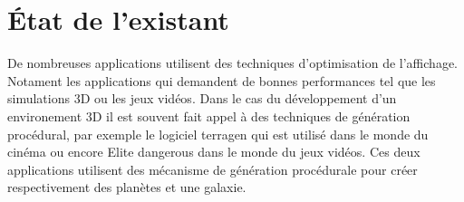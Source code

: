 \documentclass[12pt]{report}
\begin{document}
\newpage

\chapter*{État de l'existant}
\setcounter{chapter}{2}



De nombreuses applications utilisent des techniques d'optimisation de l'affichage. Notament les applications qui demandent de bonnes performances tel que les simulations 3D ou les jeux vidéos.
Dans le cas du développement d'un environement 3D il est souvent fait appel à des techniques de génération procédural, par exemple le logiciel terragen qui est utilisé dans le monde du cinéma ou encore Elite dangerous dans le monde du jeux vidéos.
Ces deux applications utilisent des mécanisme de génération procédurale pour créer respectivement des planètes et une galaxie.
\end{document}
